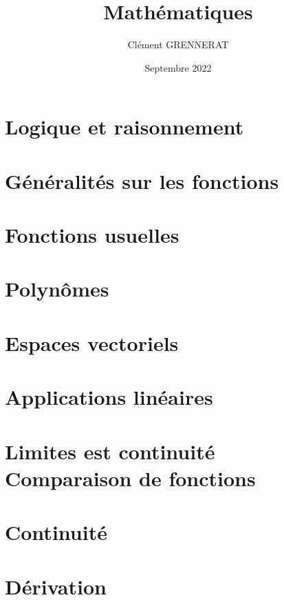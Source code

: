 \documentclass[13pt, twoside, a4paper, french]{report}
\newcommand*{\getSubject}{Mathématiques}
\begin{document}
    \title{\getSubject}
    \author{Clément GRENNERAT}
    \date{Septembre 2022}
    \pagestyle{non-chapter-style}


    \chapter{Logique et raisonnement}\label{ch:logique-et-raisonnement}
    


    \chapter{Généralités sur les fonctions}\label{ch:generalites-sur-les-fonctions}
    


    \chapter{Fonctions usuelles}\label{ch:fonctions-usuelles}
    


    \chapter{Polynômes}\label{ch:polynomes}
    


    \chapter{Espaces vectoriels}\label{ch:espaces-vectoriels}
    


    \chapter{Applications linéaires}\label{ch:applications-lineaires}
    


    \chapter{Limites est continuité\\Comparaison de fonctions}\label{ch:limites-est-continuite---comparaison-de-fonctions}
    

    \chapter{Continuité}\label{ch:continuite}
    

    \chapter{Dérivation}\label{ch:derivation}
    
\end{document}
